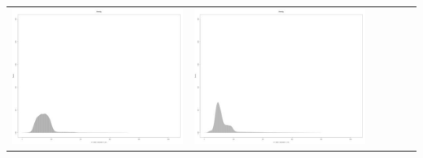 \begin{table}[htbp]
{\begin{tabular}{l | ccccc}
\begin{minipage}{.15\textwidth}
     			 	\includegraphics[width=\linewidth]{images/mema-dens-graph/I8}
    				 \end{minipage}
    			   &	 \begin{minipage}{.15\textwidth}\vspace{2pt}     							
     			 	\includegraphics[width=\linewidth]{images/mema-dens-graph/I11}
    				 \end{minipage}
    			   &	 \begin{minipage}{.15\textwidth}\vspace{2pt}     							

\end{minipage}
\end{tabular}}
\end{table}

